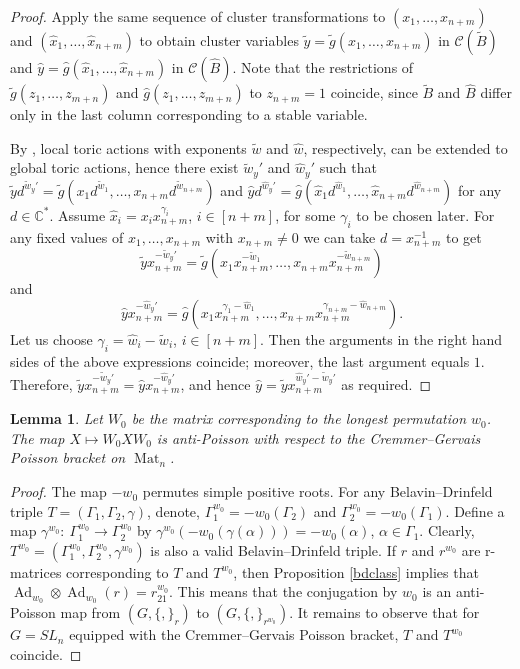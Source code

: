 \documentclass{amsart}
\newtheorem{lemma}[theorem]{Lemma}
\theoremstyle{definition}
\theoremstyle{remark}
\numberwithin{equation}{section}
\numberwithin{theorem}{section}
\begin{document}
\begin{proof} Apply the same sequence of cluster transformations  
to $(x_1,\dots,x_{n+m})$ and $(\hat x_1,\dots,\hat x_{n+m})$
to obtain cluster variables 
$\tilde y=\tilde g(x_1,\dots,x_{n+m})$ in ${{\mathcal C}}({{\widetilde{B}}})$ and $\hat y=\hat g(\hat x_1,\dots,\hat x_{n+m})$ in ${{\mathcal C}}({{\widehat{B}}})$. Note that the restrictions of $\tilde g(z_1,\dots,z_{m+n})$ and $\hat g(z_1,\dots, \allowbreak z_{m+n})$
to $z_{n+m}=1$ coincide, since ${{\widetilde{B}}}$ and ${{\widehat{B}}}$ differ only in the last column corresponding to a stable
variable.

By \cite[Lemma 2.3]{GSV1}, local toric actions with exponents $\tilde w$ and $\hat w$, respectively, can be extended to global toric actions, hence there exist $\tilde w_y'$ and $\hat w_y'$ such that 
$\tilde y d^{\tilde w_y'}=\tilde g(x_1d^{\tilde w_1},\dots,x_{n+m}d^{\tilde w_{n+m}})$ and 
$\hat yd^{\hat w_y'} =
\hat g(\hat x_1d^{\hat w_1},\dots,\hat x_{n+m}d^{\hat w_{n+m}})$ for any $d\in{{\mathbb C}}^*$. 
Assume $\hat x_i=x_ix_{n+m}^{\gamma_i}$, $i\in[n+m]$, for some $\gamma_i$ to be chosen later. For any 
fixed values of $x_1,\dots,x_{n+m}$ with $x_{n+m}\ne0$ we can take $d=x_{n+m}^{-1}$ to get
$$
\tilde y x_{n+m}^{-\tilde w_y'}=\tilde g(x_1x_{n+m}^{-\tilde w_1},\dots,x_{n+m}x_{n+m}^{-\tilde w_{n+m}})
$$ 
and 
$$
\hat y x_{n+m}^{-\hat w_y'} =
\hat g(x_1x_{n+m}^{\gamma_1-\hat w_1},\dots,x_{n+m}x_{n+m}^{\gamma_{n+m}-\hat w_{n+m}}).
$$
Let us choose $\gamma_i=\hat w_i-\tilde w_i$, $i\in [n+m]$. Then the arguments in the right hand sides of the above expressions coincide; moreover, the last argument equals $1$. Therefore, $\tilde y x_{n+m}^{-\tilde w_y'}=
 \hat y x_{n+m}^{-\hat w_y'}$, and hence $\hat y=\tilde y x_{n+m}^{\hat w_y'-\tilde w_y'}$ as required.
\end{proof}

  \begin{lemma}
 \label{antipoiss}
Let  $W_0$ be the matrix corresponding to the longest permutation $w_0$. The map $X
\mapsto W_0 X W_0$ is anti-Poisson with respect to
the Cremmer--Gervais Poisson bracket on ${\operatorname{Mat}}_n$.
 \end{lemma}
 
 \begin{proof} The map $-w_0$ permutes simple positive roots. For any
Belavin--Drinfeld triple
 $T=(\Gamma_1,\Gamma_2, \gamma)$, denote, $\Gamma_{1}^{w_0} = - w_0(\Gamma_{2})$ and
 $\Gamma_{2}^{w_0} = - w_0(\Gamma_{1})$.
 Define a map $\gamma^{w_0} {{:\ }} \Gamma_{1}^{w_0} \to \Gamma_{2}^{w_0}$ by
$\gamma^{w_0} ( -w_0 (\gamma(\alpha)))=
 -w_0 (\alpha)$, $\alpha \in \Gamma_1$. Clearly,
$T^{w_0}=(\Gamma^{w_0}_1,\Gamma^{w_0}_2, \gamma^{w_0})$ is also a valid
Belavin--Drinfeld triple. If $r$ and $r^{w_0}$ are r-matrices corresponding to $T$
and $T^{w_0}$, then Proposition \ref{bdclass} implies that ${\operatorname{Ad}}_{w_0}\otimes
{\operatorname{Ad}}_{w_0} (r) = r^{w_0}_{21}$. This means that the conjugation by $w_0$ is an
anti-Poisson
 map from $(G,\{,\}_r)$ to $(G,\{,\}_{r^{w_0}})$. It remains to observe that for
$G=SL_n$ equipped with the Cremmer--Gervais Poisson bracket,
 $T$ and $T^{w_0}$ coincide.
 \end{proof}
 
\end{document}

